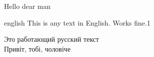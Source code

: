 \documentclass[]{lib/styles/default-style}
\begin{document}
\printTitle
\newpage
Hello dear man
\begin{otherlanguage*}{english}
This is any text in English. Works fine.1
\end{otherlanguage*}

Это работающий русский текст\\
Привіт, тобі, чоловіче

\end{document}
